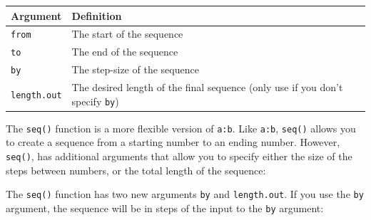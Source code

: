 \documentclass[]{book}
\theoremstyle{definition}
\theoremstyle{definition}
\theoremstyle{remark}
\begin{document}
\begin{longtable}[]{@{}ll@{}}
\toprule
\begin{minipage}[b]{0.35\columnwidth}\raggedright\strut
Argument\strut
\end{minipage} & \begin{minipage}[b]{0.41\columnwidth}\raggedright\strut
Definition\strut
\end{minipage}\tabularnewline
\midrule
\endhead
\begin{minipage}[t]{0.35\columnwidth}\raggedright\strut
\texttt{from}\strut
\end{minipage} & \begin{minipage}[t]{0.41\columnwidth}\raggedright\strut
The start of the sequence\strut
\end{minipage}\tabularnewline
\begin{minipage}[t]{0.35\columnwidth}\raggedright\strut
\texttt{to}\strut
\end{minipage} & \begin{minipage}[t]{0.41\columnwidth}\raggedright\strut
The end of the sequence\strut
\end{minipage}\tabularnewline
\begin{minipage}[t]{0.35\columnwidth}\raggedright\strut
\texttt{by}\strut
\end{minipage} & \begin{minipage}[t]{0.41\columnwidth}\raggedright\strut
The step-size of the sequence\strut
\end{minipage}\tabularnewline
\begin{minipage}[t]{0.35\columnwidth}\raggedright\strut
\texttt{length.out}\strut
\end{minipage} & \begin{minipage}[t]{0.41\columnwidth}\raggedright\strut
The desired length of the final sequence (only use if you don't specify
\texttt{by})\strut
\end{minipage}\tabularnewline
\bottomrule
\end{longtable}

The \texttt{seq()} function is a more flexible version of \texttt{a:b}.
Like \texttt{a:b}, \texttt{seq()} allows you to create a sequence from a
starting number to an ending number. However, \texttt{seq()}, has
additional arguments that allow you to specify either the size of the
steps between numbers, or the total length of the sequence:

The \texttt{seq()} function has two new arguments \texttt{by} and
\texttt{length.out}. If you use the \texttt{by} argument, the sequence
will be in steps of the input to the \texttt{by} argument:
\end{document}

